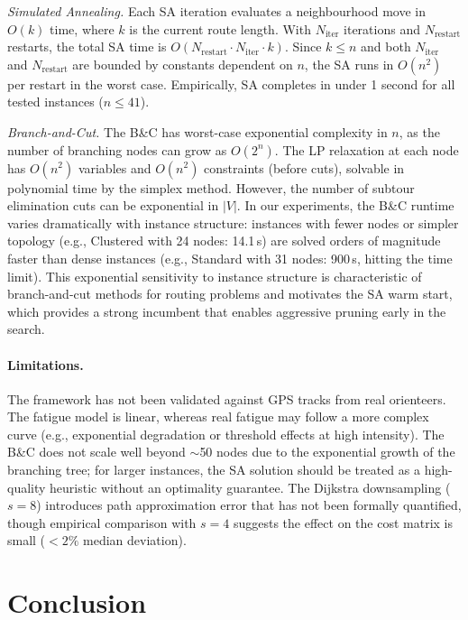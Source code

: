 \documentclass[11pt,a4paper]{article}
\begin{document}
\emph{Simulated Annealing.}
Each SA iteration evaluates a neighbourhood move in $O(k)$ time, where $k$ is the current route length.
With $N_{\text{iter}}$ iterations and $N_{\text{restart}}$ restarts, the total SA time is $O(N_{\text{restart}} \cdot N_{\text{iter}} \cdot k)$.
Since $k \leq n$ and both $N_{\text{iter}}$ and $N_{\text{restart}}$ are bounded by constants dependent on $n$, the SA runs in $O(n^2)$ per restart in the worst case.
Empirically, SA completes in under 1 second for all tested instances ($n \leq 41$).

\emph{Branch-and-Cut.}
The B\&C has worst-case exponential complexity in $n$, as the number of branching nodes can grow as $O(2^n)$.
The LP relaxation at each node has $O(n^2)$ variables and $O(n^2)$ constraints (before cuts), solvable in polynomial time by the simplex method.
However, the number of subtour elimination cuts can be exponential in $|V|$.
In our experiments, the B\&C runtime varies dramatically with instance structure:
instances with fewer nodes or simpler topology (e.g., Clustered with 24 nodes: 14.1\,s) are solved orders of magnitude faster than dense instances (e.g., Standard with 31 nodes: 900\,s, hitting the time limit).
This exponential sensitivity to instance structure is characteristic of branch-and-cut methods for routing problems and motivates the SA warm start, which provides a strong incumbent that enables aggressive pruning early in the search.

\paragraph{Limitations.}
The framework has not been validated against GPS tracks from real orienteers.
The fatigue model is linear, whereas real fatigue may follow a more complex curve (e.g., exponential degradation or threshold effects at high intensity).
The B\&C does not scale well beyond $\sim$50 nodes due to the exponential growth of the branching tree; for larger instances, the SA solution should be treated as a high-quality heuristic without an optimality guarantee.
The Dijkstra downsampling ($s = 8$) introduces path approximation error that has not been formally quantified, though empirical comparison with $s = 4$ suggests the effect on the cost matrix is small ($< 2\%$ median deviation).

\section{Conclusion}
\label{sec:conclusion}
\end{document}
